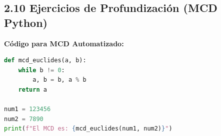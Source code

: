 \documentclass[letterpaper, 12pt]{article}
\begin{document}
\subsection{2.10 Ejercicios de Profundización (MCD Python)}

\textbf{Código para MCD Automatizado:}
\begin{lstlisting}[language=Python]
def mcd_euclides(a, b):
    while b != 0:
        a, b = b, a % b
    return a

num1 = 123456
num2 = 7890
print(f"El MCD es: {mcd_euclides(num1, num2)}")
\end{lstlisting}
\end{document}

